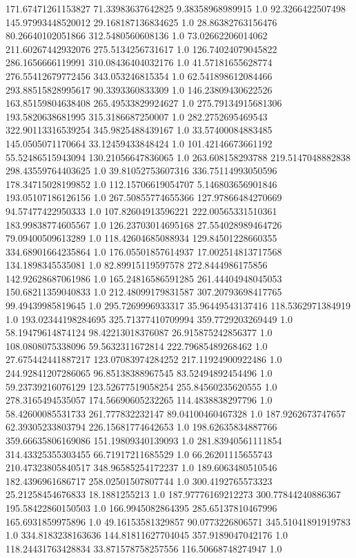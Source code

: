 171.67471261153827	71.33983637642825	9.38358968989915	1.0
92.3266422507498	145.97993448520012	29.168187136834625	1.0
28.86382763156476	80.26640102051866	312.5480560608136	1.0
73.02662206014062	211.60267442932076	275.5134256731617	1.0
126.74024079045822	286.1656666119991	310.08436404032176	1.0
41.57181655628774	276.55412679772456	343.053246815354	1.0
62.541898612084466	293.88515828995617	90.3393360833309	1.0
146.23809430622526	163.85159804638408	265.49533829924627	1.0
275.79134915681306	193.5820638681995	315.3186687250007	1.0
282.2752695469543	322.90113316539254	345.9825488439167	1.0
33.57400084883485	145.0505071170664	33.12459433848424	1.0
101.42146673661192	55.52486515943094	130.21056647836065	1.0
263.608158293788	219.5147048882838	298.43559764403625	1.0
39.81052753607316	336.75114993050596	178.34715028199852	1.0
112.15706619054707	5.146803656901846	193.05107186126156	1.0
267.50855774655366	127.97866484270669	94.57477422950333	1.0
107.82604913596221	222.00565331510361	183.99838774605567	1.0
126.23703014695168	27.554028989464726	79.09400509613289	1.0
118.42604685088934	129.84501228660355	334.68901664235864	1.0
176.05501857614937	17.002514813717568	134.1898345535081	1.0
82.89915119597578	272.8444986175856	142.92628687061986	1.0
165.24816586591285	261.44404948045053	150.68211359040833	1.0
212.48099179831587	307.20793698417765	99.49439985819645	1.0
295.7269996933317	35.96449543137416	118.5362971384919	1.0
193.02344198284695	325.71377410709994	359.7729203269449	1.0
58.19479614874124	98.42213018376087	26.915875242856377	1.0
108.0808075338096	59.5632311672814	222.79685489268462	1.0
27.675442441887217	123.07083974284252	217.11924900922486	1.0
244.92841207286065	96.85138388967545	83.52494892454496	1.0
59.23739216076129	123.52677519058254	255.84560235620555	1.0
278.3165494535057	174.56690605232265	114.4838838297796	1.0
58.42600085531733	261.777832232147	89.04100460467328	1.0
187.9262673747657	62.39305233803794	226.15681774642653	1.0
198.62635834887766	359.66635806169086	151.19809340139093	1.0
281.83940561111854	314.43325355303455	66.71917211685529	1.0
66.26201115655743	210.47323805840517	348.96585254172237	1.0
189.6063480510546	182.4396961686717	258.02501507807744	1.0
300.4192765573323	25.21258454676833	18.1881255213	1.0
187.97776169212273	300.77844240886367	195.58422860150503	1.0
166.9945082864395	285.65137810467996	165.6931859975896	1.0
49.16153581329857	90.0773226806571	345.51041891919783	1.0
334.8183238163636	144.81811627704045	357.9189047042176	1.0
118.24431763428834	33.871578758257556	116.50668748274947	1.0
